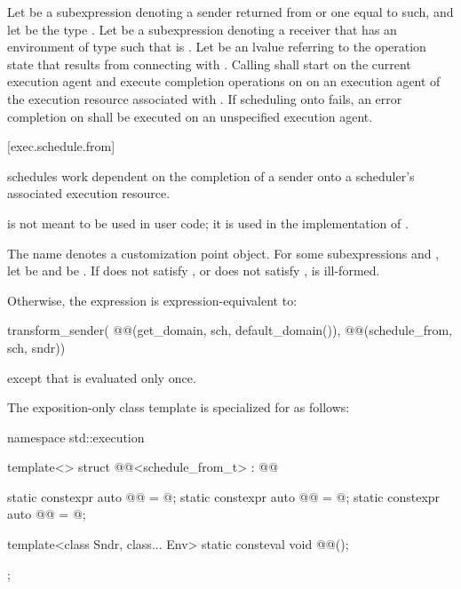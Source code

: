 \pnum
Let  be a subexpression denoting
a sender returned from  or one equal to such, and
let  be the type .
Let  be a subexpression denoting a receiver
that has an environment of type 
such that  is .
Let  be an lvalue referring to the operation state
that results from connecting  with .
Calling  shall
start  on the current execution agent and
execute completion operations on 
on an execution agent of the execution resource associated with .
If scheduling onto  fails,
an error completion on  shall be executed
on an unspecified execution agent.

[exec.schedule.from]{}

\pnum
{} schedules work dependent on the completion of a sender
onto a scheduler's associated execution resource.
\begin{note}
 is not meant to be used in user code;
it is used in the implementation of .
\end{note}

\pnum
The name  denotes a customization point object.
For some subexpressions  and ,
let  be  and
 be .
If  does not satisfy , or
 does not satisfy ,
 is ill-formed.

\pnum
Otherwise,
the expression  is expression-equivalent to:
\begin{codeblock}
transform_sender(
  @@(get_domain, sch, default_domain()),
  @@(schedule_from, sch, sndr))
\end{codeblock}
except that  is evaluated only once.

\pnum
The exposition-only class template 
is specialized for  as follows:
%
\begin{codeblock}
namespace std::execution {
  template<>
  struct @@<schedule_from_t> : @@ {
    static constexpr auto @@ = @\seebelow@;
    static constexpr auto @@ = @\seebelow@;
    static constexpr auto @@ = @\seebelow@;

    template<class Sndr, class... Env>
      static consteval void @@();
  };
}
\end{codeblock}

